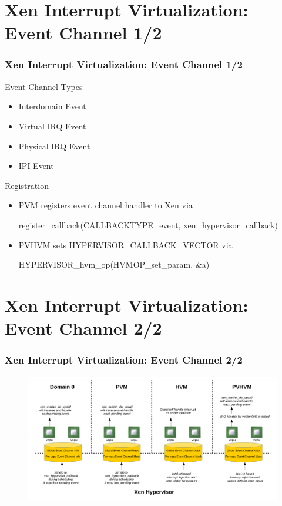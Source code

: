 \documentclass[aspectratio=169]{beamer}
\begin{document}
\section{Xen Interrupt Virtualization: Event Channel 1/2}
\begin{frame}
\frametitle{Xen Interrupt Virtualization: Event Channel 1/2}
\begin{block}{Event Channel Types}
\begin{itemize}
\item Interdomain Event
\item Virtual IRQ Event
\item Physical IRQ Event
\item IPI Event
\end{itemize}
\end{block}
\begin{block}{Registration}
\begin{itemize}
\item PVM registers event channel handler to Xen via 

register\_callback(CALLBACKTYPE\_event, xen\_hypervisor\_callback)

\item PVHVM sets HYPERVISOR\_CALLBACK\_VECTOR via

HYPERVISOR\_hvm\_op(HVMOP\_set\_param, \&a)
\end{itemize}
\end{block}

\end{frame}


\section{Xen Interrupt Virtualization: Event Channel 2/2}
\begin{frame}
\frametitle{Xen Interrupt Virtualization: Event Channel 2/2}
\begin{figure}
\includegraphics[width=1.0\linewidth]{figures/evtchn.pdf}
\end{figure}
\end{frame}
\end{document}
